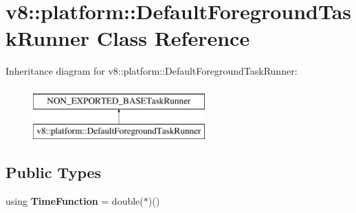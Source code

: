 \hypertarget{classv8_1_1platform_1_1DefaultForegroundTaskRunner}{}\section{v8\+:\+:platform\+:\+:Default\+Foreground\+Task\+Runner Class Reference}
\label{classv8_1_1platform_1_1DefaultForegroundTaskRunner}
Inheritance diagram for v8\+:\+:platform\+:\+:Default\+Foreground\+Task\+Runner\+:\begin{figure}[H]
\begin{center}
\leavevmode
\includegraphics[height=2.000000cm]{classv8_1_1platform_1_1DefaultForegroundTaskRunner}
\end{center}
\end{figure}
\subsection*{Public Types}
\begin{DoxyCompactItemize}
\item 
\mbox{\label{classv8_1_1platform_1_1DefaultForegroundTaskRunner_a1222d6bb883a836840ee781e3dfbc33f}} 
using {\bfseries Time\+Function} = double($\ast$)()
\end{DoxyCompactItemize}
